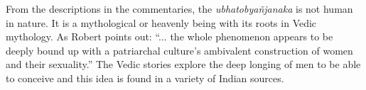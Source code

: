 From the descriptions in the commentaries, the {\em ubhatob­yañ­janaka} is not human in nature. It is a mythological or heavenly being with its roots in  Vedic mythology. As Robert \cite{goldman} points out: ``... the whole phenomenon appears to be deeply bound up with a patriarchal culture's ambivalent construction of women and their sexuality.'' The Vedic stories explore the deep longing of men to be able to conceive and this idea is found in a variety of Indian sources.

